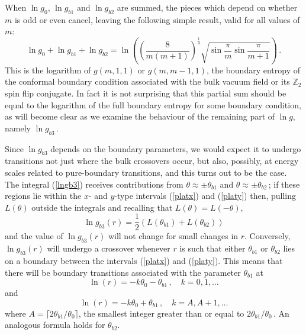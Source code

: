 \documentclass[11pt]{article}
\newcommand\ZZ{{\mathbb Z}}
\newcommand\phup{^{\phantom o}}
\newcommand\beq{\begin{equation}}
\newcommand\eeq{\end{equation}}
\newcommand\half{{\textstyle\frac{1}{2}}}
\newcommand{\tbi}{\theta_{b1}}
\newcommand{\tbii}{\theta_{b2}}
\newcommand{\tz}{\theta_0}
\newcommand{\go}{g\phup_{0}}
\newcommand{\gi}{g\phup_{b1}}
\newcommand{\gii}{g\phup_{b2}}
\newcommand{\giii}{g\phup_{b3}}
\begin{document}
When $\ln\go$, $\ln\gi$ and $\ln\gii$
are summed, the pieces which depend on whether
$m$ is odd or even cancel, leaving the following simple result, valid 
for all values of $m$:
\beq  
\ln\go+\ln\gi+\ln\gii=
\ln\left(\left(\frac{8}{m(m+1)}\right)^{\frac{1}{4}}
\sqrt{\sin\frac{\pi}{m}\sin\frac{\pi}{m+1}}\right)\,.
\label{lng0sum}
\eeq
This is the logarithm of $g(m,1,1)$ or $g(m,m{-}1,1)$, the boundary 
entropy of the
conformal boundary condition associated with the bulk vacuum field or
its $\ZZ_2$ spin flip conjugate.
In fact it is not surprising that this partial sum should be equal to 
the logarithm of
the full boundary entropy for some boundary condition, as will become
clear as we examine the behaviour of the remaining part of $\ln g$,
namely $\ln\giii$\,.

Since $\ln\giii$ depends on the boundary parameters, we would expect it
to undergo transitions not just where the bulk
crossovers occur, but also, possibly, at energy scales related to
pure-boundary transitions, and this turns out to be the case.
The integral (\ref{lngb3}) receives
contributions from 
$\theta\approx\pm\tbi$ and
$\theta\approx\pm\tbii$\,; if these regions lie within the
$x$- and $y$-type
intervals (\ref{platx}) and (\ref{platy}) 
then, pulling
$L(\theta)$ outside the integrals and recalling that
$L(\theta)=L(-\theta)$,
\beq
\ln\giii(r)=
\half\left(L\left(\tbi\right)+L\left(\tbii\right)\right)
 \label{lngb3f}
\eeq
and the value of $\ln\giii(r)$ will not change for small changes in
$r$. 
Conversely, $\ln\giii(r)$ will undergo a crossover whenever $r$
is such that 
either $\tbi$ or $\tbii$ lies on a boundary between the
intervals (\ref{platx}) and (\ref{platy}).
This means that there
will be boundary transitions associated with the parameter
$\tbi$ at
\beq
\ln(r)=-k\tz-\tbi\,,\quad  k=0,1,\dots
\eeq
and 
\beq
\ln(r)=-k\tz+\tbi\,,\quad  k=A,A{+}1,\dots
\eeq
where $A=\lceil 2\tbi/\tz\rceil$, the smallest integer
greater than or equal to $2\tbi/\tz$\,. An analogous
formula holds for $\tbii$. 
\end{document}
